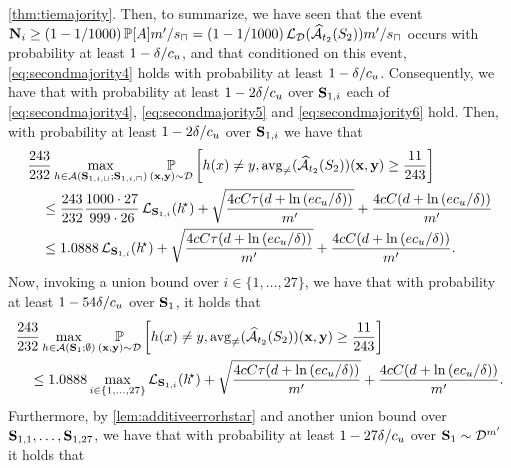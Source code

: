 \begin{proofof}{\cref{thm:tiemajority}.}
Then, to summarize, we have seen that the event $\mathbf{N}_{i}\geq (1-1/1000)\operatorname*{\mathbb{P}}[A]m'/s_{\sqcap}=(1-1/1000)\operatorname{\mathcal{L}}_{\mathcal{D}}(\widehat{\mathcal{A}}_{t_{2}}(S_{2}))m'/s_{\sqcap}$ occurs with probability at least $ 1-\delta/c_{u} $, and that conditioned on this event, \cref{eq:secondmajority4} holds with probability at least $ 1-\delta/c_{u} $. Consequently, we have that with probability at least $ 1-2\delta/c_{u} $ over $ \mathbf{S}_{1,i} $ each of \cref{eq:secondmajority4}, \cref{eq:secondmajority5} and \cref{eq:secondmajority6} hold. Then, with probability at least $ 1-2\delta/c_{u} $ over $ \mathbf{S}_{1,i} $ we have that
\begin{align*}
& \frac{243}{232}\max_{h\in \mathcal{A}(\mathbf{S}_{1,i,\sqcup};\mathbf{S}_{1,i,\sqcap})}\operatorname*{\mathbb{P}}_{(\mathbf{x},\mathbf{y})\sim \mathcal{D}}\left[h(x)\not=y,\operatorname{\mathrm{avg}_{\not=}}(\widehat{\mathcal{A}}_{t_{2}}(S_{2}))(\mathbf{x},\mathbf{y})\geq \frac{11}{243}\right] \\
& \quad \leq \frac{243}{232} \frac{1000\cdot27}{999\cdot26}\operatorname{\mathcal{L}}_{\mathbf{S}_{1,i}}(h^{\negmedspace\star})+\sqrt{\frac{4cC\tau(d+\ln{\left(ec_{u}/\delta \right)})}{m'}}+\frac{4cC(d+\ln{\left(ec_{u}/\delta \right)})}{m'}
    \\
& \quad \leq 1.0888\operatorname{\mathcal{L}}_{\mathbf{S}_{1,i}}(h^{\negmedspace\star})+\sqrt{\frac{4cC\tau(d+\ln{\left(ec_{u}/\delta \right)})}{m'}}+\frac{4cC(d+\ln{\left(ec_{u}/\delta \right)})}{m'}.
\end{align*} 
Now, invoking a union bound over $ i\in \{ 1,\ldots,27 \} $, we have that with probability at least $ 1-54\delta/c_{u} $ over $ \mathbf{S}_{1} $, it holds that
\begin{align}\label{eq:secondmajority7}
& \frac{243}{232}\max_{h\in \mathcal{A}(\mathbf{S}_{1};\emptyset)}\operatorname*{\mathbb{P}}_{(\mathbf{x},\mathbf{y})\sim \mathcal{D}}\left[h(x)\not=y,\operatorname{\mathrm{avg}_{\not=}}(\widehat{\mathcal{A}}_{t_{2}}(S_{2}))(\mathbf{x},\mathbf{y})\geq \frac{11}{243}\right] \nonumber \\
&\quad \leq 1.0888\max_{i\in\{  1,\ldots,27\} }\operatorname{\mathcal{L}}_{\mathbf{S}_{1,i}}(h^{\negmedspace\star})+\sqrt{\frac{4cC\tau(d+\ln{\left(ec_{u}/\delta \right)})}{m'}}+\frac{4cC(d+\ln{\left(ec_{u}/\delta \right)})}{m'}. 
\end{align}
Furthermore, by \cref{lem:additiveerrorhstar} and another union bound over $ \mathbf{S}_{1,1},\ldots,\mathbf{S}_{1,27} $, we have that with probability at least $ 1-27\delta/c_{u} $ over $ \mathbf{S}_{1}\sim \mathcal{D}^{m'}$ it holds that


\end{proofof}
